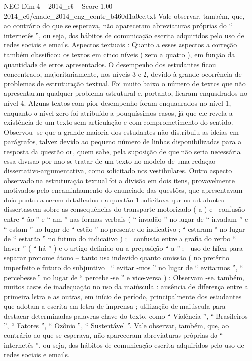 \begin{textsample}{NEG Dim 4 – 2014\_c6 – Score 1.00 – 2014\_c6/enade\_2014\_eng\_contr\_b460d1a0ee.txt}
Vale observar, também, que, ao contrário do que se esperava, não apareceram abreviaturas próprias do “ internetês ”, ou seja, dos hábitos de comunicação escrita adquiridos pelo uso de redes sociais e emails.
Aspectos textuais : Quanto a esses aspectos a correção também classificou os textos em cinco níveis ( zero a quatro ), em função da quantidade de erros apresentados.
O desempenho dos estudantes ficou concentrado, majoritariamente, nos níveis 3 e 2, devido à grande ocorrência de problemas de estruturação textual.
Foi muito baixo o número de textos que não apresentaram qualquer problema estrutural e, portanto, ficaram enquadrados no nível 4.
Alguns textos com pior desempenho foram enquadrados no nível 1, enquanto o nível zero foi atribuído a pouquíssimos casos, já que ele revela a existência de um texto sem articulação e com comprometimento do sentido.
Observou -se que a grande maioria dos estudantes não distribuiu as ideias em parágrafos, talvez devido ao pequeno número de linhas disponibilizadas para a resposta da questão ou, quem sabe, pela suposição de que não seria necessária essa divisão por não se tratar de um texto no modelo de uma redação dissertativo-argumentativa, como solicitado nos vestibulares.
Outro aspecto observado na estruturação textual foi a divisão em dois itens, provavelmente motivados pelo encaminhamento do enunciado das questões, que apresentavam dois pontos a serem detalhados : a questão 1 solicitava que os estudantes dissertassem sobre as consequências do transporte motorizado ( a ) e  confusão entre “ ão ” e “ am ” nas formas verbais ( “ invadão ” no lugar de “ invadam ” e “ estam ” no lugar de “ estão ” no presente do indicativo ; “ estaram ” no lugar de “ estarão ” no futuro do indicativo ) ;  confusão entre a grafia do verbo “ haver ” ( “ há ” ) e o artigo definido ou a preposição “ a ” ;  uso de hífen para separar pronome átono – tanto uso indevido quanto omissão ( no pretérito imperfeito e futuro do subjuntivo : “ evitar -mos ” no lugar de “ evitarmos ”, “ percebesse ” no lugar de “ percebe -se ” e vice-versa ) ; Observam -se, também, muitos casos de inadequação no uso da maiúscula : ausência de diferença entre a primeira letra e as outras, em início de período, principalmente dos estudantes que adotam a escrita em letra de imprensa ; utilização de maiúscula para destacar determinadas palavras-chave do texto, como “ Violência ”, “ Brasileiros ”, “ Fatores ”, “ Ozônio ”, “ Sustentável ”.
Vale observar, também, que, ao contrário do que se esperava, não apareceram abreviaturas próprias do “ internetês ”, ou seja, dos hábitos de comunicação escrita adquiridos pelo uso de redes sociais e emails.

\end{textsample}
